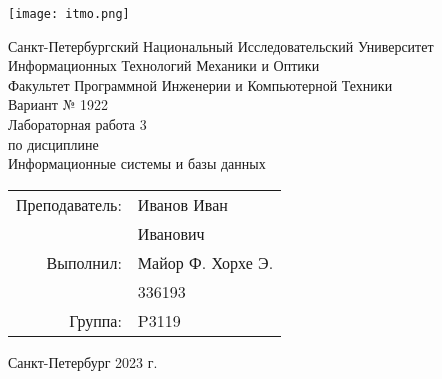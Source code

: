 \newcommand{\teachername}{Иван}
\newcommand{\teacherpatronimic}{Иванович}
\newcommand{\teacherlastname}{Иванов}
\newcommand{\studentname}{Майор Ф. Хорхе Э.}
\newcommand{\studentcode}{336193}
\newcommand{\group}{P3119}
\newcommand{\variant}{1922}
\newcommand{\typeofwork}{Лабораторная работа}
\newcommand{\laboratorynumber}{3}
\newcommand{\subject}{Информационные системы и базы данных}
\renewcommand{\date}{2023}

\begin{titlepage}
    \begin{center}
        {\texttt{[image: itmo.png]}\par}
        Санкт-Петербургский Национальный Исследовательский Университет Информационных Технологий Механики и Оптики\\
        \vspace{\fill}
        Факультет Программной Инженерии и Компьютерной Техники\\
        \vspace{\fill}
        Вариант № \variant\\
	\typeofwork{} \laboratorynumber\\
        по дисциплине\\
        \subject
    \end{center}
    
    \vspace{\fill}
    
    \begin{flushright}
        \begin{tabular}{ r l }
            Преподаватель:  & \teacherlastname{} \teachername \\
                            & \teacherpatronimic \\
            Выполнил:       & \studentname \\
                            & \studentcode \\
            Группа:         & \group \\
        \end{tabular}
    \end{flushright}

    \vspace{1em}
	
	\begin{center}
		Санкт-Петербург \date{} г. \\
	\end{center}
\end{titlepage}
